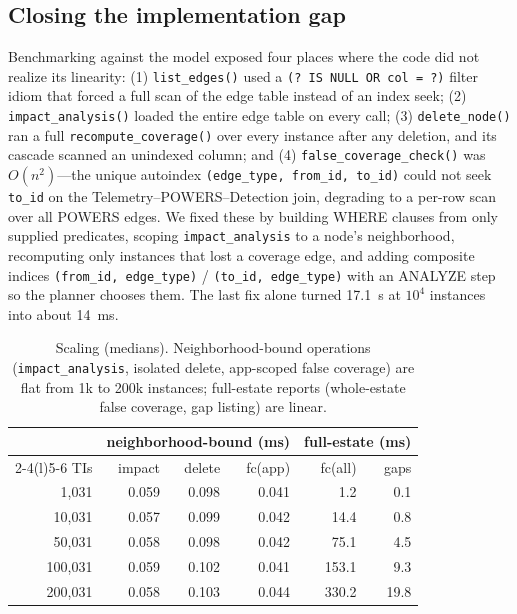 \documentclass[10pt]{article}
\newcommand{\code}[1]{\texttt{#1}}
\begin{document}
\subsection{Closing the implementation gap}
Benchmarking against the model exposed four places where the code did not realize its linearity: (1) \code{list\_edges()} used a \code{(? IS NULL OR col = ?)} filter idiom that forced a full scan of the edge table instead of an index seek; (2) \code{impact\_analysis()} loaded the entire edge table on every call; (3) \code{delete\_node()} ran a full \code{recompute\_coverage()} over every instance after any deletion, and its cascade scanned an unindexed column; and (4) \code{false\_coverage\_check()} was $O(n^2)$---the unique autoindex \code{(edge\_type, from\_id, to\_id)} could not seek \code{to\_id} on the Telemetry--POWERS--Detection join, degrading to a per-row scan over all POWERS edges. We fixed these by building WHERE clauses from only supplied predicates, scoping \code{impact\_analysis} to a node's neighborhood, recomputing only instances that lost a coverage edge, and adding composite indices \code{(from\_id, edge\_type)} / \code{(to\_id, edge\_type)} with an ANALYZE step so the planner chooses them. The last fix alone turned 17.1~s at $10^4$ instances into about 14~ms.

\begin{table}[t]
\centering
\small
\begin{tabular}{@{}r r r r r r@{}}
\toprule
& \multicolumn{3}{c}{neighborhood-bound (ms)} & \multicolumn{2}{c}{full-estate (ms)}\\
\cmidrule(lr){2-4}\cmidrule(l){5-6}
TIs & impact & delete & fc(app) & fc(all) & gaps\\
\midrule
1,031 & 0.059 & 0.098 & 0.041 & 1.2 & 0.1\\
10,031 & 0.057 & 0.099 & 0.042 & 14.4 & 0.8\\
50,031 & 0.058 & 0.098 & 0.042 & 75.1 & 4.5\\
100,031 & 0.059 & 0.102 & 0.041 & 153.1 & 9.3\\
200,031 & 0.058 & 0.103 & 0.044 & 330.2 & 19.8\\
\bottomrule
\end{tabular}
\caption{Scaling (medians). Neighborhood-bound operations (\code{impact\_analysis}, isolated delete, app-scoped false coverage) are flat from 1k to 200k instances; full-estate reports (whole-estate false coverage, gap listing) are linear.}
\label{tab:scaling}
\end{table}
\end{document}
